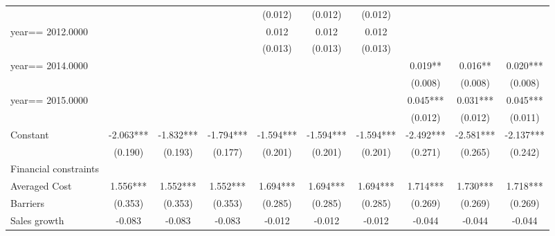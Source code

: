 \begin{table}[htbp]
\begin{tabular}{l*{9}{c}}
                    &               &               &               &     (0.012)   &     (0.012)   &     (0.012)   &               &               &               \\
year==  2012.0000   &               &               &               &       0.012   &       0.012   &       0.012   &               &               &               \\
                    &               &               &               &     (0.013)   &     (0.013)   &     (0.013)   &               &               &               \\
year==  2014.0000   &               &               &               &               &               &               &       0.019** &       0.016** &       0.020***\\
                    &               &               &               &               &               &               &     (0.008)   &     (0.008)   &     (0.008)   \\
year==  2015.0000   &               &               &               &               &               &               &       0.045***&       0.031***&       0.045***\\
                    &               &               &               &               &               &               &     (0.012)   &     (0.012)   &     (0.011)   \\
Constant            &      -2.063***&      -1.832***&      -1.794***&      -1.594***&      -1.594***&      -1.594***&      -2.492***&      -2.581***&      -2.137***\\
                    &     (0.190)   &     (0.193)   &     (0.177)   &     (0.201)   &     (0.201)   &     (0.201)   &     (0.271)   &     (0.265)   &     (0.242)   \\
\hline
Financial constraints&               &               &               &               &               &               &               &               &               \\
Averaged Cost       &       1.556***&       1.552***&       1.552***&       1.694***&       1.694***&       1.694***&       1.714***&       1.730***&       1.718***\\
Barriers            &     (0.353)   &     (0.353)   &     (0.353)   &     (0.285)   &     (0.285)   &     (0.285)   &     (0.269)   &     (0.269)   &     (0.269)   \\
Sales growth        &      -0.083   &      -0.083   &      -0.083   &      -0.012   &      -0.012   &      -0.012   &      -0.044   &      -0.044   &      -0.044   \\

\end{tabular}
\end{table}
